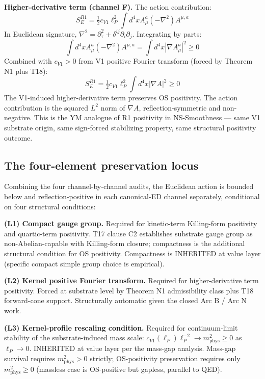 \documentclass[11pt,a4paper]{article}
\begin{document}
\textbf{Higher-derivative term (channel F).} The action contribution:
\[
S_E^{R1} = \tfrac{1}{2} c_{V1} \ell_P^{2} \int d^{4}x A_\mu^a (-\nabla^{2}) A^{\mu,a}
\]
In Euclidean signature, $\nabla^{2} = \partial_\tau^{2} + \delta^{ij} \partial_i \partial_j$. Integrating by parts:
\[
\int d^{4}x A_\mu^a (-\nabla^{2}) A^{\mu,a} = \int d^{4}x |\nabla A_\mu^a|^{2} \geq 0
\]
Combined with $c_{V1} > 0$ from V1 positive Fourier transform (forced by Theorem N1 plus T18):
\[
S_E^{R1} = \tfrac{1}{2} c_{V1} \ell_P^{2} \int d^{4}x |\nabla A|^{2} \geq 0
\]
The V1-induced higher-derivative term preserves OS positivity. The action contribution is the squared $L^{2}$ norm of $\nabla A$, reflection-symmetric and non-negative. This is the YM analogue of R1 positivity in NS-Smoothness --- same V1 substrate origin, same sign-forced stabilizing property, same structural positivity outcome.

\subsection{The four-element preservation locus}

Combining the four channel-by-channel audits, the Euclidean action is bounded below and reflection-positive in each canonical-ED channel separately, conditional on four structural conditions:

\textbf{(L1) Compact gauge group.} Required for kinetic-term Killing-form positivity and quartic-term positivity. T17 clause C2 establishes substrate gauge group as non-Abelian-capable with Killing-form closure; compactness is the additional structural condition for OS positivity. Compactness is INHERITED at value layer (specific compact simple group choice is empirical).

\textbf{(L2) Kernel positive Fourier transform.} Required for higher-derivative term positivity. Forced at substrate level by Theorem N1 admissibility class plus T18 forward-cone support. Structurally automatic given the closed Arc B / Arc N work.

\textbf{(L3) Kernel-profile rescaling condition.} Required for continuum-limit stability of the substrate-induced mass scale: $c_{V1}(\ell_P) \ell_P^{-2} \to m_\mathrm{phys}^{2} \geq 0$ as $\ell_P \to 0$. INHERITED at value layer per the mass-gap analysis. Mass-gap survival requires $m_\mathrm{phys}^{2} > 0$ strictly; OS-positivity preservation requires only $m_\mathrm{phys}^{2} \geq 0$ (massless case is OS-positive but gapless, parallel to QED).
\end{document}
